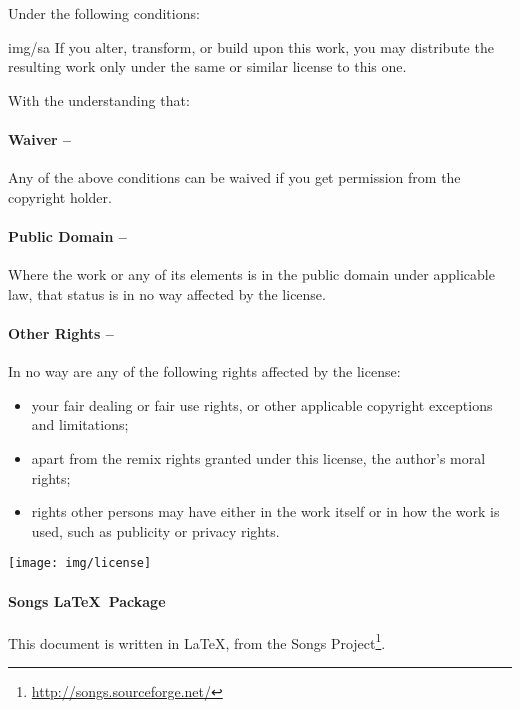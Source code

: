 {\begin{lblock}{Under the following conditions:}
    \begin{pictonote}{img/sa}
       If you alter, transform, or build upon
      this work, you may distribute the resulting work only under the
      same or similar license to this one.
    \end{pictonote}

  \end{lblock}
  \begin{lblock}{With the understanding that:}

    \hspace{0.4cm}
    \parbox{15cm}{
      \paragraph{Waiver --}
      Any of the above conditions can be waived if you get permission
      from the copyright holder.

      \paragraph{Public Domain --}
      Where the work or any of its elements is in the public domain
      under applicable law, that status is in no way affected by the
      license.

      \paragraph{Other Rights --}
      In no way are any of the following rights affected by the license:
      \begin{itemize}
      \item your fair dealing or fair use rights, or other applicable
        copyright exceptions and limitations;
      \item apart from the remix rights granted under this license,
        the author's moral rights;
      \item rights other persons may have either in the work itself
        or in how the work is used, such as publicity or privacy rights.
      \end{itemize}
    }

    \begin{center}
      \texttt{[image: img/license]}
    \end{center}

  \end{lblock}
  \paragraph{Songs \LaTeX~Package}
  This document is written in \LaTeX, from the Songs
  Project\footnote{\url{http://songs.sourceforge.net/}}.
}
